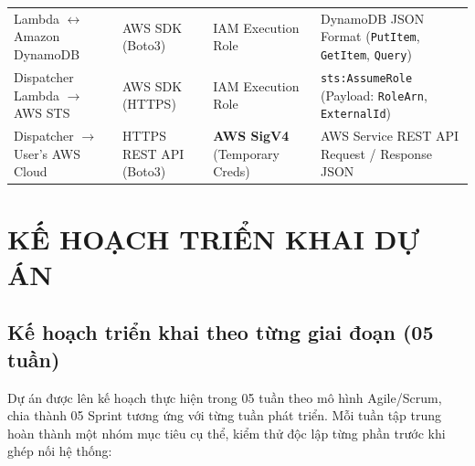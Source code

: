 \documentclass[a4paper,12pt]{article}
\begin{document}
\begin{table}[H]
\begin{tabularx}{\linewidth}{@{}>{\raggedright\arraybackslash}p{4.6cm}>{\raggedright\arraybackslash}p{2.4cm}>{\raggedright\arraybackslash}p{3.2cm}Y@{}}
Lambda $\leftrightarrow$ Amazon DynamoDB & AWS SDK (Boto3) & IAM Execution Role & DynamoDB JSON Format (\texttt{PutItem}, \texttt{GetItem}, \texttt{Query})\\
Dispatcher Lambda $\rightarrow$ AWS STS & AWS SDK (HTTPS) & IAM Execution Role & \texttt{sts:AssumeRole} (Payload: \texttt{RoleArn}, \texttt{ExternalId})\\
Dispatcher $\rightarrow$ User's AWS Cloud & HTTPS REST API (Boto3) & \textbf{AWS SigV4} (Temporary Creds) & AWS Service REST API Request / Response JSON\\
\bottomrule
\end{tabularx}
\endgroup
\end{table}

\clearpage

\section{KẾ HOẠCH TRIỂN KHAI DỰ ÁN}

\subsection{Kế hoạch triển khai theo từng giai đoạn (05 tuần)}

Dự án được lên kế hoạch thực hiện trong 05 tuần theo mô hình Agile/Scrum, chia thành 05 Sprint tương ứng với từng tuần phát triển. Mỗi tuần tập trung hoàn thành một nhóm mục tiêu cụ thể, kiểm thử độc lập từng phần trước khi ghép nối hệ thống:
\end{document}
